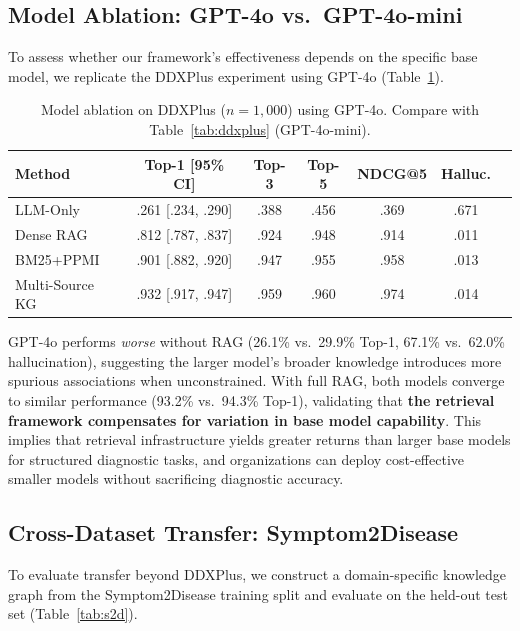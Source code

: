 \documentclass[runningheads]{llncs}
\begin{document}
\subsection{Model Ablation: GPT-4o vs.\ GPT-4o-mini}
\label{sec:model_ablation}

To assess whether our framework's effectiveness depends on the specific base model, we replicate the DDXPlus experiment using GPT-4o (Table~\ref{tab:gpt4o}).

\begin{table}[t]
\centering
\caption{Model ablation on DDXPlus ($n{=}1{,}000$) using GPT-4o. Compare with Table~\ref{tab:ddxplus} (GPT-4o-mini).}
\label{tab:gpt4o}
\begin{tabular}{lcccccc}
\toprule
\textbf{Method} & \textbf{Top-1 [95\% CI]} & \textbf{Top-3} & \textbf{Top-5} & \textbf{NDCG@5} & \textbf{Halluc.} \\
\midrule
LLM-Only       & .261 [.234, .290] & .388 & .456 & .369 & .671 \\
Dense RAG       & .812 [.787, .837] & .924 & .948 & .914 & .011 \\
BM25+PPMI       & .901 [.882, .920] & .947 & .955 & .958 & .013 \\
Multi-Source KG & .932 [.917, .947] & .959 & .960 & .974 & .014 \\
\bottomrule
\end{tabular}
\end{table}

GPT-4o performs \emph{worse} without RAG (26.1\% vs.\ 29.9\% Top-1, 67.1\% vs.\ 62.0\% hallucination), suggesting the larger model's broader knowledge introduces more spurious associations when unconstrained. With full RAG, both models converge to similar performance (93.2\% vs.\ 94.3\% Top-1), validating that \textbf{the retrieval framework compensates for variation in base model capability}. This implies that retrieval infrastructure yields greater returns than larger base models for structured diagnostic tasks, and organizations can deploy cost-effective smaller models without sacrificing diagnostic accuracy.

\subsection{Cross-Dataset Transfer: Symptom2Disease}
\label{sec:cross_domain}

To evaluate transfer beyond DDXPlus, we construct a domain-specific knowledge graph from the Symptom2Disease training split and evaluate on the held-out test set (Table~\ref{tab:s2d}).
\end{document}
